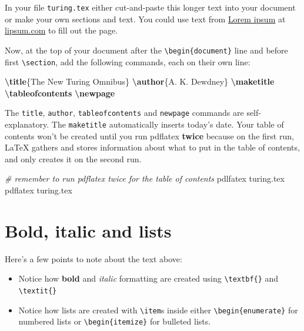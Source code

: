\documentclass[
]{book}
\newenvironment{Shaded}{\begin{snugshade}}{\end{snugshade}}
\newcommand{\CommentTok}[1]{\textcolor[rgb]{0.56,0.35,0.01}{\textit{#1}}}
\newcommand{\FunctionTok}[1]{\textcolor[rgb]{0.13,0.29,0.53}{\textbf{#1}}}
\newcommand{\NormalTok}[1]{#1}
\providecommand{\tightlist}{%
  \setlength{\itemsep}{0pt}\setlength{\parskip}{0pt}}
\begin{document}
In your file \texttt{turing.tex} either cut-and-paste this longer text into your document or make your own sections and text. You could use text from \href{https://en.wikipedia.org/wiki/Lorem_ipsum}{Lorem ipsum} at \href{https://www.lipsum.com}{lipsum.com} to fill out the page.

Now, at the top of your document after the \texttt{\textbackslash{}begin\{document\}} line and before first \texttt{\textbackslash{}section}, add the following commands, each on their own line:

\begin{Shaded}
\begin{Highlighting}[]
\FunctionTok{\textbackslash{}title}\NormalTok{\{The New Turing Omnibus\}}
\FunctionTok{\textbackslash{}author}\NormalTok{\{A. K. Dewdney\}}
\FunctionTok{\textbackslash{}maketitle}
\FunctionTok{\textbackslash{}tableofcontents}
\FunctionTok{\textbackslash{}newpage}
\end{Highlighting}
\end{Shaded}

The \texttt{title}, \texttt{author}, \texttt{tableofcontents} and \texttt{newpage} commands are self-explanatory. The \texttt{maketitle} automatically inserts today's date. Your table of contents won't be created until you run pdflatex \textbf{twice} because on the first run, LaTeX gathers and stores information about what to put in the table of contents, and only creates it on the second run.

\begin{Shaded}
\begin{Highlighting}[]
\CommentTok{\# remember to run pdflatex twice for the table of contents}
\NormalTok{pdlfatex turing.tex}
\NormalTok{pdflatex turing.tex}
\end{Highlighting}
\end{Shaded}

\section{Bold, italic and lists}\label{bold-italic-and-lists}

Here's a few points to note about the text above:

\begin{itemize}
\tightlist
\item
  Notice how \textbf{bold} and \emph{italic} formatting are created using \texttt{\textbackslash{}textbf\{\}} and \texttt{\textbackslash{}textit\{\}}
\item
  Notice how lists are created with \texttt{\textbackslash{}item}s inside either \texttt{\textbackslash{}begin\{enumerate\}} for numbered lists or \texttt{\textbackslash{}begin\{itemize\}} for bulleted lists.
\end{itemize}
\end{document}
